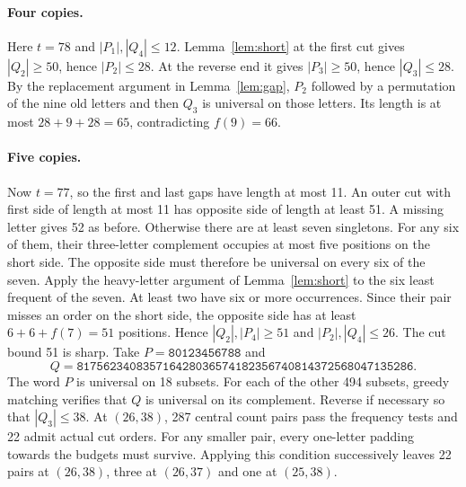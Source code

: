 \documentclass[11pt]{article}
\begin{document}
\paragraph{Four copies.}
Here $t=78$ and $|P_1|,|Q_4|\le12$. Lemma~\ref{lem:short} at the first cut gives $|Q_2|\ge50$, hence $|P_2|\le28$. At the reverse end it gives $|P_3|\ge50$, hence $|Q_3|\le28$. By the replacement argument in Lemma~\ref{lem:gap}, $P_2$ followed by a permutation of the nine old letters and then $Q_3$ is universal on those letters. Its length is at most $28+9+28=65$, contradicting $f(9)=66$.

\paragraph{Five copies.}
Now $t=77$, so the first and last gaps have length at most 11. An outer cut with first side of length at most 11 has opposite side of length at least 51. A missing letter gives 52 as before. Otherwise there are at least seven singletons. For any six of them, their three-letter complement occupies at most five positions on the short side. The opposite side must therefore be universal on every six of the seven. Apply the heavy-letter argument of Lemma~\ref{lem:short} to the six least frequent of the seven. At least two have six or more occurrences. Since their pair misses an order on the short side, the opposite side has at least $6+6+f(7)=51$ positions. Hence $|Q_2|,|P_4|\ge51$ and $|P_2|,|Q_4|\le26$.
The cut bound 51 is sharp. Take $P=\texttt{80123456788}$ and
\[
Q=\texttt{817562340835716428036574182356740814372568047135286}.
\]
The word $P$ is universal on 18 subsets. For each of the other 494 subsets, greedy matching verifies that $Q$ is universal on its complement.
 Reverse if necessary so that $|Q_3|\le38$. At $(26,38)$, 287 central count pairs pass the frequency tests and 22 admit actual cut orders. For any smaller pair, every one-letter padding towards the budgets must survive. Applying this condition successively leaves 22 pairs at $(26,38)$, three at $(26,37)$ and one at $(25,38)$.
\end{document}
